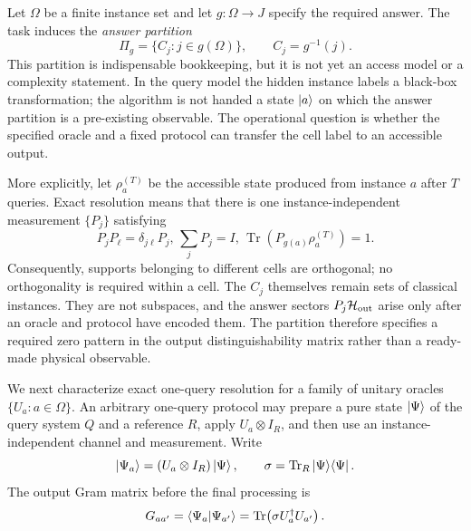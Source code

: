 \documentclass[
  aps,
  prl,
  reprint,
  nofootinbib
]{revtex4-2}
\begin{document}
Let \(\Omega\) be a finite instance set and let
\(g:\Omega\rightarrow J\) specify the required answer. The task induces the
\emph{answer partition}
\begin{equation}
 \Pi_g=\{C_j:j\in g(\Omega)\},\qquad C_j=g^{-1}(j).
 \label{eq:task-partition}
\end{equation}
This partition is indispensable bookkeeping, but it is not yet an access model
or a complexity statement.
In the query model the hidden instance labels a black-box transformation; the
algorithm is not handed a state \(\ket a\) on which the answer partition is a
pre-existing observable. The operational question is whether the specified
oracle and a fixed protocol can transfer the cell label to an accessible
output.

More explicitly, let \(\rho_a^{(T)}\) be the accessible state produced from
instance \(a\) after \(T\) queries. Exact resolution means that there is one
instance-independent measurement \(\{P_j\}\) satisfying
\begin{equation}
 P_jP_\ell=\delta_{j\ell}P_j,\,
 \sum_jP_j=I,\,
 \operatorname{Tr}(P_{g(a)}\rho_a^{(T)})=1.
 \label{eq:output-sectors}
\end{equation}
Consequently, supports belonging to different cells are orthogonal; no
orthogonality is required within a cell. The \(C_j\) themselves remain sets of
classical instances. They are not subspaces, and the answer sectors
\(P_j\mathcal H_{\rm out}\) arise only after an oracle and protocol have
encoded them. The partition therefore specifies a required zero pattern in
the output distinguishability matrix rather than a ready-made physical
observable.

We next characterize exact one-query resolution for a family of unitary
oracles \(\{U_a:a\in\Omega\}\). An arbitrary
one-query protocol may prepare a pure state \(\ket\Psi\) of the query system
\(Q\) and a reference \(R\), apply \(U_a\otimes I_R\), and then use an
instance-independent channel and measurement. Write
\begin{equation}
 \ket{\Psi_a}=(U_a\otimes I_R)\ket\Psi,
 \qquad
 \sigma=\operatorname{Tr}_R\ket\Psi\!\bra\Psi .
\end{equation}
The output Gram matrix before the final processing is
\begin{equation}
 G_{aa'}=\braket{\Psi_a|\Psi_{a'}}
 =\operatorname{Tr}\!\left(\sigma U_a^\dagger U_{a'}\right).
 \label{eq:gram}
\end{equation}
\end{document}
